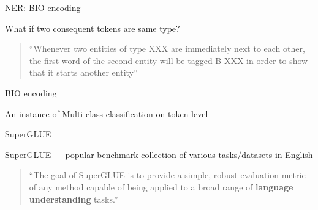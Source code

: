 \documentclass[12pt,aspectratio=169,handout]{beamer}
\begin{document}
\begin{frame}[fragile]{NER: BIO encoding}
	
What if two consequent tokens are same type?

\bigskip
	
\begin{quote}
``Whenever two entities of type XXX are immediately next to each other, the first word of the second entity will be tagged B-XXX in order to show that it starts another entity''
\end{quote}


BIO encoding

\bigskip

An instance of Multi-class classification on token level

\end{frame}



\begin{frame}{SuperGLUE}
	
SuperGLUE --- popular benchmark collection of various tasks/datasets in English
	

\bigskip

\begin{quote}
``The goal of SuperGLUE is to provide a simple, robust evaluation metric of any method capable of being applied to a broad range of \textbf{language understanding} tasks.''
\end{quote}
	
	

	
\end{frame}
\end{document}
